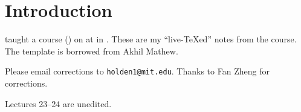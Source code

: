 \title{\thecoursename}
\author{Lectures delivered  by \thelecturer \\ Notes by \thescribe}
\date{\thesemester, \thelocation}
\renewcommand{\headrulewidth}{0pt}
\fancyhead{}
\fancyfoot{}\maketitle
\begin{center}

\end{center}
\pagestyle{fancy}

\tableofcontents

\newpage 
\section*{Introduction}

\thelecturer{} taught a course (\thecoursenum{}) on \thecoursename{} at
\thelocation{} in \thesemester{}.  
These are my ``live-\TeX ed'' notes from the course.  The template is borrowed from Akhil Mathew.





Please email corrections to
\verb=holden1@mit.edu=. Thanks to Fan Zheng for corrections.

Lectures 23--24 are unedited.

\newpage


\fancyfoot[C]{\thepage}


\renewcommand{\whattosay}{Lecture \thesection \\ }
\pagestyle{fancy}
